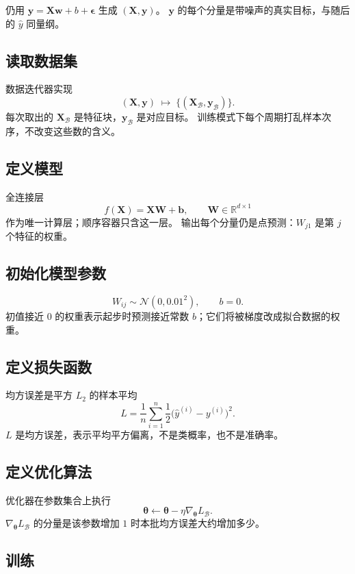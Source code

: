 仍用 $\bm{y}=\bm{X}\bm{w}+b+\bm{\epsilon}$ 生成 $(\bm{X},\bm{y})$。
$\bm{y}$ 的每个分量是带噪声的真实目标，与随后的 $\hat{y}$ 同量纲。

\subsection{读取数据集}

数据迭代器实现
\[
(\bm{X},\bm{y})
\;\longmapsto\;
\{(\bm{X}_{\mathcal{B}},\bm{y}_{\mathcal{B}})\}.
\]
每次取出的 $\bm{X}_{\mathcal{B}}$ 是特征块，$\bm{y}_{\mathcal{B}}$ 是对应目标。
训练模式下每个周期打乱样本次序，不改变这些数的含义。

\subsection{定义模型}

全连接层
\[
f(\bm{X})=\bm{X}\bm{W}+\bm{b},\qquad \bm{W}\in\mathbb{R}^{d\times 1}
\]
作为唯一计算层；顺序容器只含这一层。
输出每个分量仍是点预测：$W_{j1}$ 是第 $j$ 个特征的权重。

\subsection{初始化模型参数}

\[
W_{ij}\sim\mathcal{N}(0,0.01^{2}),\qquad b=0.
\]
初值接近 $0$ 的权重表示起步时预测接近常数 $b$；它们将被梯度改成拟合数据的权重。

\subsection{定义损失函数}

均方误差是平方 $L_{2}$ 的样本平均
\[
L=\frac{1}{n}\sum_{i=1}^{n}\frac{1}{2}\bigl(\hat{y}^{(i)}-y^{(i)}\bigr)^{2}.
\]
$L$ 是均方误差，表示平均平方偏离，不是类概率，也不是准确率。

\subsection{定义优化算法}

优化器在参数集合上执行
\[
\bm{\theta}\leftarrow\bm{\theta}-\eta\nabla_{\bm{\theta}}L_{\mathcal{B}}.
\]
$\nabla_{\bm{\theta}}L_{\mathcal{B}}$ 的分量是该参数增加 $1$ 时本批均方误差大约增加多少。

\subsection{训练}


